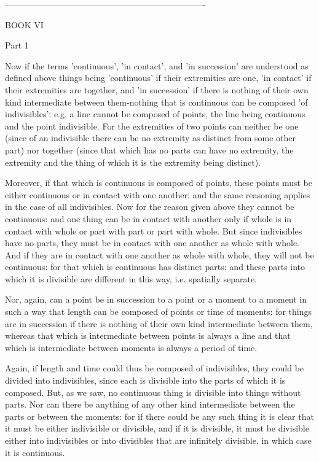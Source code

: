 ----------------------------------------------------------------------

BOOK VI

Part 1 

Now if the terms 'continuous', 'in contact', and 'in succession'
are understood as defined above things being 'continuous' if their
extremities are one, 'in contact' if their extremities are together,
and 'in succession' if there is nothing of their own kind intermediate
between them-nothing that is continuous can be composed 'of indivisibles':
e.g. a line cannot be composed of points, the line being continuous
and the point indivisible. For the extremities of two points can neither
be one (since of an indivisible there can be no extremity as distinct
from some other part) nor together (since that which has no parts
can have no extremity, the extremity and the thing of which it is
the extremity being distinct). 

Moreover, if that which is continuous is composed of points, these
points must be either continuous or in contact with one another: and
the same reasoning applies in the case of all indivisibles. Now for
the reason given above they cannot be continuous: and one thing can
be in contact with another only if whole is in contact with whole
or part with part or part with whole. But since indivisibles have
no parts, they must be in contact with one another as whole with whole.
And if they are in contact with one another as whole with whole, they
will not be continuous: for that which is continuous has distinct
parts: and these parts into which it is divisible are different in
this way, i.e. spatially separate. 

Nor, again, can a point be in succession to a point or a moment to
a moment in such a way that length can be composed of points or time
of moments: for things are in succession if there is nothing of their
own kind intermediate between them, whereas that which is intermediate
between points is always a line and that which is intermediate between
moments is always a period of time. 

Again, if length and time could thus be composed of indivisibles,
they could be divided into indivisibles, since each is divisible into
the parts of which it is composed. But, as we saw, no continuous thing
is divisible into things without parts. Nor can there be anything
of any other kind intermediate between the parts or between the moments:
for if there could be any such thing it is clear that it must be either
indivisible or divisible, and if it is divisible, it must be divisible
either into indivisibles or into divisibles that are infinitely divisible,
in which case it is continuous. 

